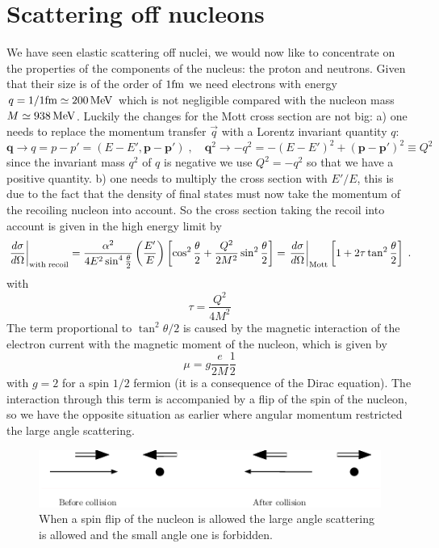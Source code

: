 \documentclass[12pt]{article}
\newcommand{\V}[1]{\mathbf{#1}}
\begin{document}
\section{Scattering off nucleons}
We have seen elastic scattering off nuclei, we would now like to concentrate on the properties of the components of the nucleus: the proton and neutrons. Given that their size is of the order of  $1\rm{fm}$ we need electrons with energy $q=1/1\rm{fm}\simeq 200\,\rm{MeV}$ which is not negligible compared with the nucleon mass $M\simeq 938\,\rm{MeV}$. Luckily the changes for the Mott cross section are not big: a) one needs to replace the momentum transfer $\vec{q}$ with a Lorentz invariant quantity $q$:
\[\V{q}\rightarrow q=p-p'=(E-E',\V{p}-\V{p'})\;,\quad \V{q}^2\rightarrow -q^2=-(E-E')^2+(\V{p}-\V{p'})^2\equiv Q^2\] 
since the invariant mass $q^2$ of $q$ is negative we use $Q^2=-q^2$ so that we have a positive quantity. b) one needs to multiply the cross section with $E'/E$, this is due to the fact that the density of final states must now take the momentum of the recoiling nucleon into account. So the cross section taking the recoil into account is given in the high energy limit by
\[
\left.\frac{d\sigma}{d\Omega}\right|_{\rm{with}\;\rm{recoil}}
=
\frac{\alpha^2}{4E^2\sin^4\frac{\theta}{2}}
\left(
\frac{E'}{E}\right)
\left[
\cos^2\frac{\theta}{2}+\frac{Q^2}{2M^2}\sin^2\frac{\theta}{2}\right]
=
\left.\frac{d\sigma}{d\Omega}\right|_{\rm{Mott}} \left[
1+2\tau\tan^2\frac{\theta}{2}\right]\;.
\]	
with 
\[\tau=\frac{Q^2}{4M^2}\]
The term proportional to $\tan^2\theta/2$ is caused by the magnetic interaction of the electron current with the magnetic moment of the nucleon, which is given by 
\[\mu=g\frac{e}{2M}\frac{1}{2}\]
with $g=2$ for a spin $1/2$ fermion (it is a consequence of the Dirac equation). The interaction through this term is accompanied by a flip of the  
spin of the nucleon, so we have the opposite situation as earlier where angular momentum restricted the large angle scattering. 
\begin{figure}
\begin{center}
\includegraphics[scale=0.7]{images/scattering180b.png}
\end{center}
\caption{When a spin flip of the nucleon is allowed the large angle scattering is allowed and the small angle one is forbidden.}\label{fig:spinflip}
\end{figure}
\end{document}
